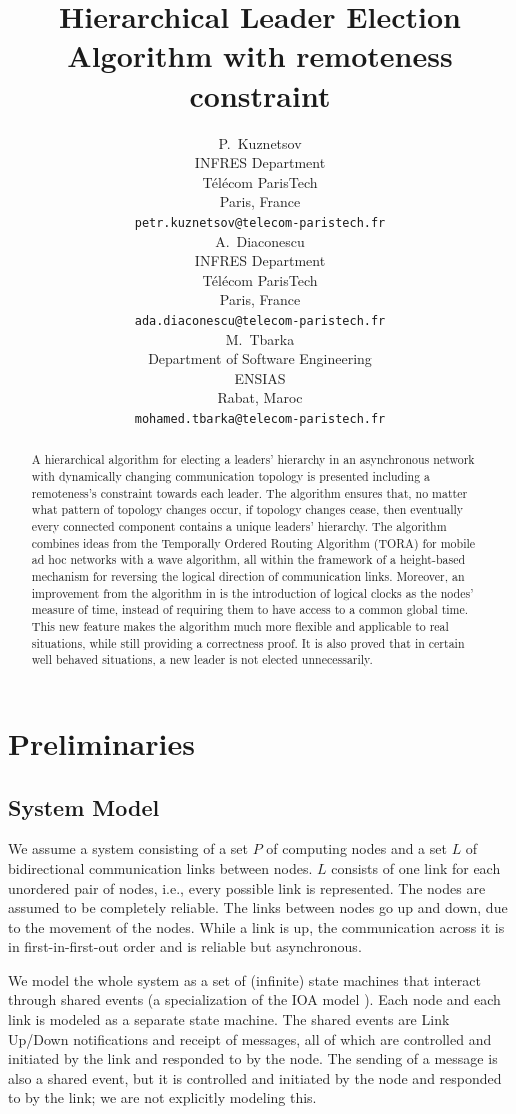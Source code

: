 \documentclass{article}
\title{Hierarchical Leader Election Algorithm with remoteness constraint}
\author{
  P.~Kuznetsov \\
  INFRES Department\\
  Télécom ParisTech\\
  Paris, France \\
  \texttt{petr.kuznetsov@telecom-paristech.fr} \\
  \And
  A.~Diaconescu \\
  INFRES Department\\
  Télécom ParisTech\\
  Paris, France \\
  \texttt{ada.diaconescu@telecom-paristech.fr} \\
  \And
  M.~Tbarka \\
  Department of Software Engineering\\
  ENSIAS\\
  Rabat, Maroc \\
  \texttt{mohamed.tbarka@telecom-paristech.fr} \\
}
\begin{document}
\maketitle

\begin{abstract}
A hierarchical algorithm for electing a leaders' hierarchy in an asynchronous network with dynamically changing communication topology is presented including a remoteness's constraint towards each leader. The algorithm ensures that, no matter what pattern of topology changes occur, if topology changes cease, then eventually every connected component contains a unique leaders' hierarchy. The algorithm combines ideas from the Temporally Ordered Routing Algorithm (TORA) for mobile ad hoc networks with a wave algorithm, all within the framework of a height-based mechanism for reversing the logical direction of communication links. Moreover, an improvement from the algorithm in is the introduction of logical clocks as the nodes’ measure of time, instead of requiring them to have access to a common global time. This new feature makes the algorithm much more flexible and applicable to real situations, while still providing a correctness proof. It is also proved that in certain well behaved situations, a new leader is not elected unnecessarily.
\end{abstract}



\section{Preliminaries}

\subsection{System Model}
We assume a system consisting of a set $P$ of computing nodes and a set $L$ of bidirectional communication links between nodes. $L$ consists of one link for each unordered pair of nodes, i.e., every possible link is represented. The nodes are assumed to be completely reliable. The links between nodes go up and down, due to the movement of the nodes. While a link is up, the communication across it is in first-in-first-out order and is reliable but asynchronous.

We model the whole system as a set of (infinite) state machines that interact through shared events (a specialization of the IOA model \cite{kour2014real}). Each node and each link is modeled as a separate state machine. The shared events are Link Up/Down notifications and receipt of messages, all of which are controlled and initiated by the link and responded to by the node. The sending of a message is also a shared event, but it is controlled and initiated by the node and responded to by the link; we are not explicitly modeling this.
\end{document}
